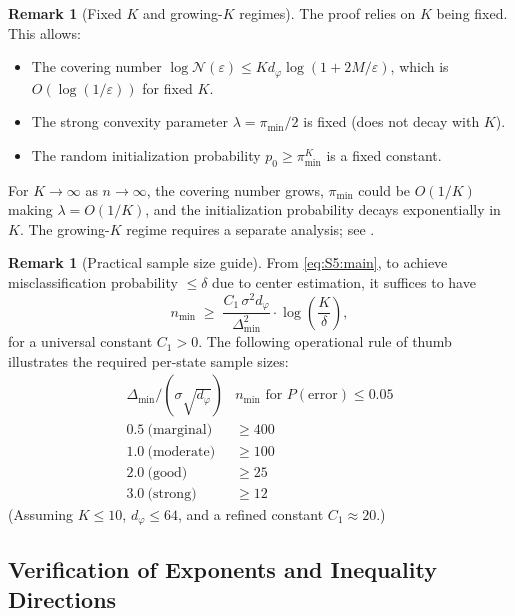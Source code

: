\documentclass[twoside]{article}
\theoremstyle{plain}
\theoremstyle{definition}
\newtheorem{remark}[theorem]{Remark}
\theoremstyle{remark}
\newcommand{\1}{\mathbf{1}}
\renewcommand{\epsilon}{\varepsilon}
\renewcommand{\phi}{\varphi}
\begin{document}
\begin{remark}[Fixed $K$ and growing-$K$ regimes]
\label{rem:S5:fixedK}
The proof relies on $K$ being fixed.  This allows:
\begin{itemize}
\item The covering number $\log\mathcal{N}(\epsilon)\le
K d_\phi\log(1+2M/\epsilon)$, which is $O(\log(1/\epsilon))$ for fixed $K$.
\item The strong convexity parameter $\lambda=\pi_{\min}/2$ is fixed
(does not decay with $K$).
\item The random initialization probability $p_0\ge\pi_{\min}^K$ is a
fixed constant.
\end{itemize}
For $K\to\infty$ as $n\to\infty$, the covering number grows, $\pi_{\min}$
could be $O(1/K)$ making $\lambda=O(1/K)$, and the initialization
probability decays exponentially in $K$.  The growing-$K$ regime requires
a separate analysis; see \cite{pollard1981strong,lei2013statistical}.
\end{remark}

\begin{remark}[Practical sample size guide]
\label{rem:S5:samples}
From \eqref{eq:S5:main}, to achieve misclassification probability
$\le\delta$ due to center estimation, it suffices to have
\[
n_{\min}\;\ge\;
\frac{C_1\,\sigma^2 d_\phi}{\Delta_{\min}^2}
\cdot\log\!\left(\frac{K}{\delta}\right),
\]
for a universal constant $C_1>0$.  The following operational rule of
thumb illustrates the required per-state sample sizes:
\[
\begin{array}{c|c}
\Delta_{\min}/(\sigma\sqrt{d_\phi}) & n_{\min}\text{ for }P(\text{error})\le0.05 \\ \hline
0.5\ \text{(marginal)} & \ge400 \\
1.0\ \text{(moderate)} & \ge100 \\
2.0\ \text{(good)}     & \ge25  \\
3.0\ \text{(strong)}   & \ge12
\end{array}
\]
(Assuming $K\le10$, $d_\phi\le64$, and a refined constant $C_1\approx20$.)
\end{remark}

\subsection{Verification of Exponents and Inequality Directions}
\label{sec:S5:verify}
\end{document}
